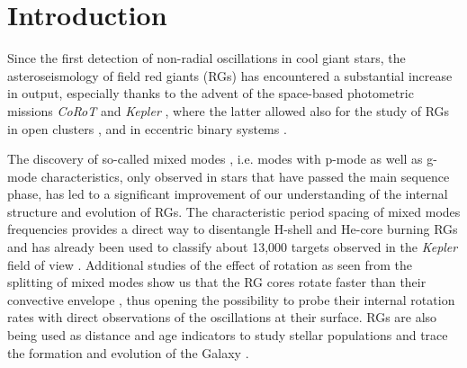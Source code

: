 \documentclass[structabstract]{aa}
\newcommand{\kepler}{\textit{Kepler} }
\begin{document}
%
\maketitle
%
\section{Introduction}
\label{sec:intro}
Since the first detection of non-radial oscillations in cool giant stars, the asteroseismology of field red giants (RGs) has encountered a substantial increase in output, especially thanks to the advent of the space-based photometric missions \textit{CoRoT} \citep[e.g.][]{DeRidder09,Kallinger10CoRoT,Mosser11universal,Mosser11mixed} and \kepler \citep[e.g.][]{Borucki10,Koch10,Bedding10,Huber10,Kallinger10Kepler,Kallinger12}, where the latter allowed also for the study of RGs in open clusters \citep[e.g.][]{Stello11membership,Miglio12,Corsaro12}, and in eccentric binary systems \citep{Beck14eccentric}. 

The discovery of so-called mixed modes \citep{Beck11Science,Mosser11mixed}, i.e. modes with p-mode as well as g-mode characteristics, only observed in stars that have passed the main sequence phase, has led to a significant improvement of our understanding of the internal structure and evolution of RGs. The characteristic period spacing of mixed modes frequencies provides a direct way to disentangle H-shell and He-core burning RGs \citep{Bedding11Nature,Mosser12} and has already been used to classify about 13,000 targets observed in the \kepler field of view \citep{Stello13}. Additional studies of the effect of rotation as seen from the splitting of mixed modes show us that the RG cores rotate faster than their convective envelope \citep{Beck12Nature,Deheuvels12,Mosser12spin}, thus opening the possibility to probe their internal rotation rates with direct observations of the oscillations at their surface. RGs are also being used as distance and age indicators to study stellar populations and trace the formation and evolution of the Galaxy \citep[e.g. see][]{Miglio09,Miglio13,Miglio15}.
\end{document}
